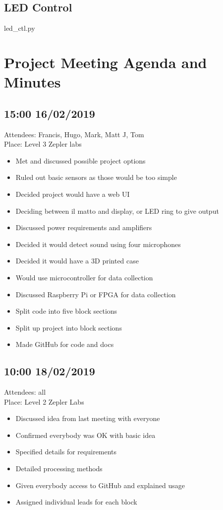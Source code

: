 \documentclass[a4paper]{article}
\begin{document}
\subsection{LED Control}
led\_ctl.py


\section{Project Meeting Agenda and Minutes}
\subsection{15:00 16/02/2019}
Attendees: Francis, Hugo, Mark, Matt J, Tom \\
Place: Level 3 Zepler labs
\begin{itemize}
\item Met and discussed possible project options
\item Ruled out basic sensors as those would be too simple
\item Decided project would have a web UI
\item Deciding between il matto and display, or LED ring to give output
\item Discussed power requirements and amplifiers
\item Decided it would detect sound using four microphones
\item Decided it would have a 3D printed case
\item Would use microcontroller for data collection
\item Discussed Raspberry Pi or FPGA for data collection
\item Split code into five block sections
\item Split up project into block sections
\item Made GitHub for code and docs
\end{itemize}

\subsection{10:00 18/02/2019}
Attendees: all \\
Place: Level 2 Zepler Labs
\begin{itemize}
\item Discussed idea from last meeting with everyone
\item Confirmed everybody was OK with basic idea
\item Specified details for requirements
\item Detailed processing methods
\item Given everybody access to GitHub and explained usage
\item Assigned individual leads for each block
\end{itemize}
\end{document}
